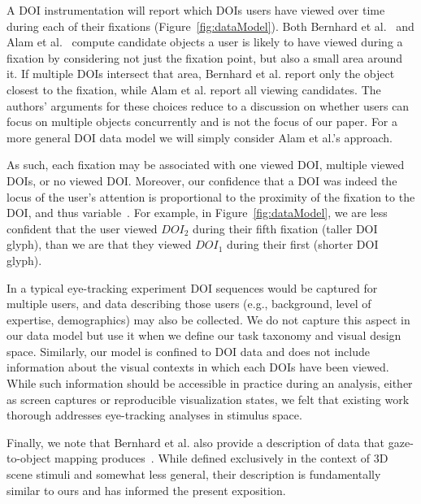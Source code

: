A DOI instrumentation will report which DOIs users have viewed over time during each of their fixations (Figure~\ref{fig:dataModel}). Both Bernhard et al.~\cite{bernhard2014gaze} and Alam et al.~\cite{alam15analyzing} compute candidate objects a user is likely to have viewed during a fixation by considering not just the fixation point, but also a small area around it.  If multiple DOIs intersect that area, Bernhard et al. report only the object closest to the fixation, while Alam et al. report all viewing candidates.  The authors' arguments for these choices reduce to a discussion on whether users can focus on multiple objects concurrently and is not the focus of our paper. For a more general DOI data model we will simply consider Alam et al.'s approach. 

As such, each fixation may be associated with one viewed DOI, multiple viewed DOIs, or no viewed DOI. Moreover, our confidence that a DOI was indeed the locus of the user's attention is proportional to the proximity of the fixation to the DOI, and thus variable~\cite{alam15analyzing}. For example, in Figure~\ref{fig:dataModel}, we are less confident that the user viewed $DOI_2$ during their fifth fixation (taller DOI glyph), than we are that they viewed $DOI_1$ during their first (shorter DOI glyph). 

In a typical eye-tracking experiment DOI sequences would be captured for multiple users, and data describing those users (e.g., background, level of expertise, demographics) may also be collected. We do not capture this aspect in our data model but use it when we define our task taxonomy and visual design space. Similarly, our model is confined to DOI data and does not include information about the visual contexts in which each DOIs have been viewed.  While such information should be accessible in practice during an analysis, either as screen captures or reproducible visualization states, we felt that existing work thorough addresses eye-tracking analyses in stimulus space. 

Finally, we note that Bernhard et al. also provide a description of data that gaze-to-object mapping produces~\cite{bernhard2014gaze}. While defined exclusively in the context of 3D scene stimuli and somewhat less general, their description is fundamentally similar to ours and has informed the present exposition. 


